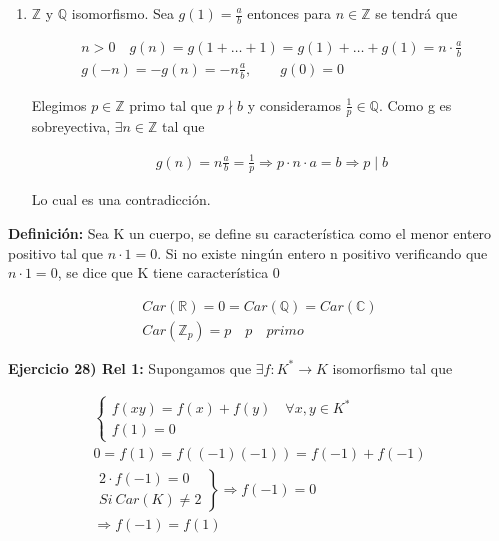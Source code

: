\documentclass{article}
\begin{document}
\begin{itemize}
\begin{enumerate}[1)]
\item $\mathbb{Z}$ y $\mathbb{Q}$ isomorfismo. Sea $g(1)=\frac{a}{b}$ entonces para $n \in \mathbb{Z}$ se tendrá que

\begin{gather*}
n>0 \quad g(n)=g(1+\ldots+1)=g(1)+\ldots+g(1)=n\cdot \frac{a}{b} \\
g(-n)=-g(n)=-n\frac{a}{b}, \qquad g(0)=0
\end{gather*}

Elegimos $p \in \mathbb{Z}$ primo tal que $p \nmid b$ y consideramos $\frac{1}{p} \in \mathbb{Q}$. Como g es sobreyectiva, $\exists n \in \mathbb{Z}$ tal que 

\begin{gather*}
g(n)=n\frac{a}{b}=\frac{1}{p}\Rightarrow p\cdot n\cdot a=b \Rightarrow p\mid b
\end{gather*}

Lo cual es una contradicción.

\end{enumerate}
\end{itemize}

\textbf{Definición:} Sea K un cuerpo, se define su característica como el menor entero positivo tal que $n\cdot 1=0$. Si no existe ningún entero n positivo verificando que $n\cdot 1=0$, se dice que K tiene característica 0

\begin{gather*}
Car(\mathbb{R})=0=Car(\mathbb{Q})=Car(\mathbb{C}) \\
Car(\mathbb{Z}_p)=p\quad p 	\quad primo
\end{gather*}

\textbf{Ejercicio 28) Rel 1:} Supongamos que $\exists f:K^*\rightarrow K$ isomorfismo tal que 

\begin{gather*}
\left\lbrace \begin{array}{c}
f(xy)=f(x)+f(y) \quad \forall x,y\in K^* \\
f(1)=0
\end{array} \right. \\
0=f(1)=f((-1)(-1))=f(-1)+f(-1) \\
\left.\begin{array}{c}
2\cdot f(-1)=0 \\
Si \: Car(K)\neq 2
\end{array} \right\rbrace
\Rightarrow f(-1)=0 \\
\Rightarrow f(-1)=f(1)
\end{gather*}
\end{document}
